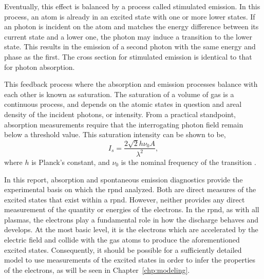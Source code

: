 Eventually, this effect is balanced by a process called stimulated emission. In
this process, an atom is already in an excited state with one or more lower
states. If an photon is incident on the atom and matches the energy difference
between its current state and a lower one, the photon may induce a transition to
the lower state. This results in the emission of a second photon with the same
energy and phase as the first. The cross section for stimulated emission is
identical to that for photon absorption.

This feedback process where the absorption and emission processes balance with
each other is known as saturation. The saturation of a volume of gas is a
continuous process, and depends on the atomic states in question and areal
density of the incident photons, or intensity. From a practical standpoint,
absorption measurements require that the interrogating photon field remain below
a threshold value. This saturation intensity can be shown \cite{Siegman1986} to
be,
\begin{equation}
  I_s = \frac{2\sqrt{2}h\nu_0A}{\lambda^2},
\end{equation}
where $h$ is Planck's constant, and $\nu_0$ is the nominal frequency of the
transition \cite{Siegman1986}.

In this report, absorption and spontaneous emission diagnostics provide the
experimental basis on which the \acs{rpnd} analyzed. Both are direct measures of
the excited states that exist within a \acs{rpnd}. However, neither provides any
direct measurement of the quantity or energies of the electrons. In the
\acs{rpnd}, as with all plasmas, the electrons play a fundamental role in how
the discharge behaves and develops. At the most basic level, it is the electrons
which are accelerated by the electric field and collide with the gas atoms to
produce the aforementioned excited states. Consequently, it should be possible
for a sufficiently detailed model to use measurements of the excited states in
order to infer the properties of the electrons, as will be seen in
Chapter~\ref{chp:modeling}.
